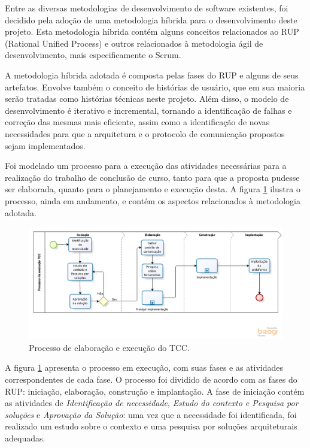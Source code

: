 Entre as diversas metodologias de desenvolvimento de software existentes, foi decidido pela adoção de uma metodologia híbrida para o desenvolvimento deste projeto. Esta metodologia híbrida contém alguns conceitos relacionados ao RUP (Rational Unified Process) e outros relacionados à metodologia ágil de desenvolvimento, mais especificamente o Scrum. 

A metodologia híbrida adotada é composta pelas fases do RUP e alguns de seus artefatos. Envolve também o conceito de histórias de usuário, que em sua maioria serão tratadas como histórias técnicas  neste projeto. Além disso, o modelo de desenvolvimento é iterativo e incremental, tornando a identificação de falhas e correção das mesmas mais eficiente, assim como a identificação de novas necessidades para que a arquitetura e o protocolo de comunicação propostos sejam implementados.

Foi modelado um processo para a execução das atividades necessárias para a realização do trabalho de conclusão de curso, tanto para que a proposta pudesse ser elaborada, quanto para o planejamento e execução desta. A figura \ref{processo_tcc} ilustra o processo, ainda em andamento, e contém os aspectos relacionados à metodologia adotada.

\begin{figure}[htb]
\centering
\includegraphics[width=1\textwidth]{figuras/processo_tcc.PNG}
\caption{Processo de elaboração e execução do TCC.}
\label{processo_tcc}
\end{figure}

A figura \ref{processo_tcc} apresenta o processo em execução, com suas fases e as atividades correspondentes de  cada fase. O processo foi dividido de acordo com as fases do RUP: iniciação, elaboração, construção e implantação. A fase de iniciação contém as atividades de \textit{Identificação de necessidade}, \textit{Estudo do contexto e Pesquisa por soluções} e \textit{Aprovação da Solução}: uma vez que a necessidade foi identificada, foi realizado um estudo sobre o contexto e uma pesquisa por soluções arquiteturais adequadas.

